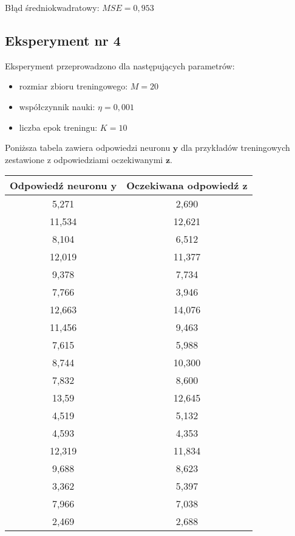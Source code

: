 \documentclass[12pt]{article}
\begin{document}
Błąd średniokwadratowy: $MSE = 0,953$

\subsection{Eksperyment nr 4}

Eksperyment przeprowadzono dla następujących parametrów:

\begin{itemize}
\item rozmiar zbioru treningowego: $M = 20$ 
\item współczynnik nauki: $\eta = 0,001$
\item liczba epok treningu: $K = 10$
\end{itemize}

Poniższa tabela zawiera odpowiedzi neuronu $\textbf{y}$ dla przykładów treningowych zestawione z odpowiedziami oczekiwanymi $\textbf{z}$.

\clearpage

\begin{table}
\begin{tabular}{|c|c|}
\hline 
Odpowiedź neuronu $\textbf{y}$ & Oczekiwana odpowiedź $\textbf{z}$ \\ 
\hline 
5,271 & 2,690 \\ \hline
11,534 & 12,621 \\ \hline
8,104 & 6,512 \\ \hline
12,019 & 11,377 \\ \hline
9,378 & 7,734 \\ \hline
7,766 & 3,946 \\ \hline
12,663 & 14,076 \\ \hline
11,456 & 9,463 \\ \hline
7,615 & 5,988 \\ \hline
8,744 & 10,300 \\ \hline
7,832 & 8,600 \\ \hline
13,59 & 12,645 \\ \hline
4,519 & 5,132 \\ \hline
4,593 & 4,353 \\ \hline
12,319 & 11,834 \\ \hline
9,688 & 8,623 \\ \hline
3,362 & 5,397 \\ \hline
7,966 & 7,038 \\ \hline
2,469 & 2,688 \\ \hline
\end{tabular} 
\end{table}
\end{document}
